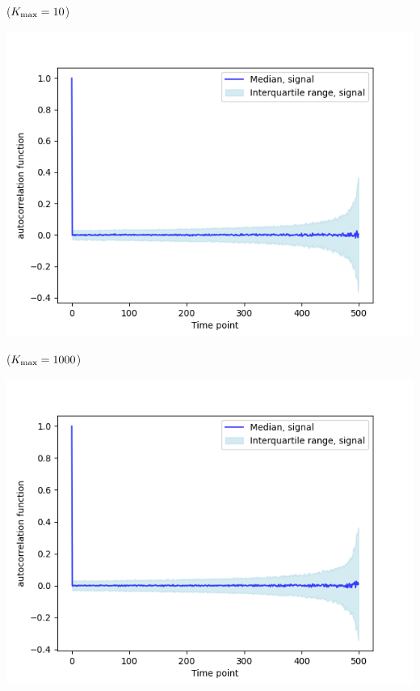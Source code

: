 \begin{enumerate}
\begin{enumerate}
\begin{enumerate}
(\(K_{\rm{max}} = 10\))
\begin{center}
\includegraphics[width=.9\linewidth]{nonstat_kmax10_samephase_1000rep_acf.png}
\end{center}

(\(K_{\rm{max}} = 1000\))
\begin{center}
\includegraphics[width=.9\linewidth]{nonstat_kmax1000_samephase_1000rep_acf.png}
\end{center}


\end{enumerate}
\end{enumerate}
\end{enumerate}
